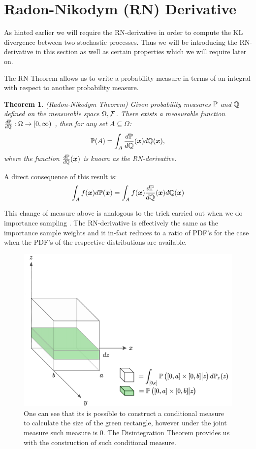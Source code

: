 \documentclass[a4paper,12pt,twoside,openright]{report}
\newtheorem{theorem}{Theorem}
\theoremstyle{definition}
\begin{document}
\section{Radon-Nikodym (RN) Derivative}

As hinted earlier we will require the RN-derivative in order to compute the KL divergence between two stochastic processes. Thus we will be introducing the RN-derivative in this section as well as certain properties which we will require later on.

The RN-Theorem allows us to write a probability measure in terms of an integral with respect to another probability measure. 

\begin{theorem}
(Radon-Nikodym Theorem)
Given probability measures $\P$ and $\Q$ defined on the measurable space $\Omega, \calF$. There exists a measurable function $\frac{d\P}{d\Q}:\Omega \rightarrow [0, \infty)$ , then for any  set $A \subseteq  \Omega$:
\begin{align}
    \P(A) = \int_{A} \frac{d\P}{d\Q}(\vx) d\Q(\vx),
\end{align}
where the function $\frac{d\P}{d\Q}(\vx)$ is known as the RN-derivative.
\end{theorem}

A direct consequence of this result is:
\begin{align*}
    \int_A f(\vx) d\P(\vx) =  \int_{A} f(\vx)  \frac{d\P}{d\Q}(\vx)  d\Q(\vx)
\end{align*}

This change of measure above is analogous to the trick carried out when we do importance sampling \citep{martino2017effective}. The RN-derivative is effectively the same as the importance sample weights and it in-fact reduces to a ratio of PDF's for the case when the PDF's of the respective distributions are available.
\begin{figure}[t!]
    \centering
    \includegraphics[scale=0.5]{images/disint2.png}
    \caption{ One can see that its is possible to construct a conditional measure to calculate the size of the green rectangle, however under the joint measure such measure is $0$. The Disintegration Theorem provides us with the construction of such conditional measure.}
    \label{fig:disintegration}
\end{figure}
\end{document}
